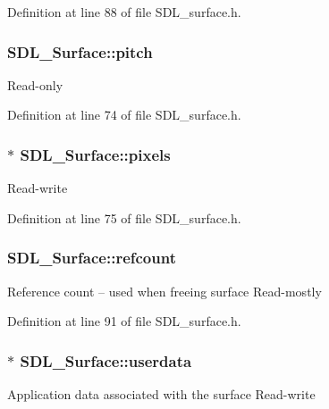 Definition at line 88 of file S\-D\-L\-\_\-surface.\-h.

\hypertarget{struct_s_d_l___surface_a5fa37325d77d65b2ed64ffc7cd01bb6c}{
\subsubsection[{pitch}]{ S\-D\-L\-\_\-\-Surface\-::pitch}}\label{struct_s_d_l___surface_a5fa37325d77d65b2ed64ffc7cd01bb6c}
Read-\/only 

Definition at line 74 of file S\-D\-L\-\_\-surface.\-h.

\hypertarget{struct_s_d_l___surface_abd9597e0e084b8ef33fe0397bc26d911}{
\subsubsection[{pixels}]{$\ast$ S\-D\-L\-\_\-\-Surface\-::pixels}}\label{struct_s_d_l___surface_abd9597e0e084b8ef33fe0397bc26d911}
Read-\/write 

Definition at line 75 of file S\-D\-L\-\_\-surface.\-h.

\hypertarget{struct_s_d_l___surface_a03d10628a359c0674f5ceffd574f1641}{
\subsubsection[{refcount}]{ S\-D\-L\-\_\-\-Surface\-::refcount}}\label{struct_s_d_l___surface_a03d10628a359c0674f5ceffd574f1641}
Reference count -- used when freeing surface Read-\/mostly 

Definition at line 91 of file S\-D\-L\-\_\-surface.\-h.

\hypertarget{struct_s_d_l___surface_ae66d973dcb9b57cb34815892e1ee1f31}{
\subsubsection[{userdata}]{$\ast$ S\-D\-L\-\_\-\-Surface\-::userdata}}\label{struct_s_d_l___surface_ae66d973dcb9b57cb34815892e1ee1f31}
Application data associated with the surface Read-\/write 

